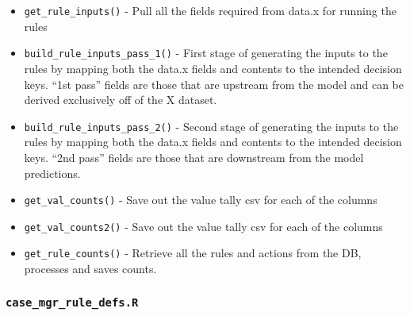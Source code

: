 \documentclass[
]{book}
\providecommand{\tightlist}{%
  \setlength{\itemsep}{0pt}\setlength{\parskip}{0pt}}
\begin{document}
\begin{itemize}
\tightlist
\item
  \texttt{get\_rule\_inputs()} - Pull all the fields required from data.x for running the rules
\item
  \texttt{build\_rule\_inputs\_pass\_1()} - First stage of generating the inputs to the rules by mapping both the data.x fields and contents to the intended decision keys. ``1st pass'' fields are those that are upstream from the model and can be derived exclusively off of the X dataset.
\item
  \texttt{build\_rule\_inputs\_pass\_2()} - Second stage of generating the inputs to the rules by mapping both the data.x fields and contents to the intended decision keys. ``2nd pass'' fields are those that are downstream from the model predictions.
\item
  \texttt{get\_val\_counts()} - Save out the value tally csv for each of the columns
\item
  \texttt{get\_val\_counts2()} - Save out the value tally csv for each of the columns
\item
  \texttt{get\_rule\_counts()} - Retrieve all the rules and actions from the DB, processes and saves counts.
\end{itemize}

\hypertarget{case_mgr_rule_defs.r}{%
\subsubsection{\texorpdfstring{\texttt{case\_mgr\_rule\_defs.R}}{case\_mgr\_rule\_defs.R}}\label{case_mgr_rule_defs.r}}
\end{document}
